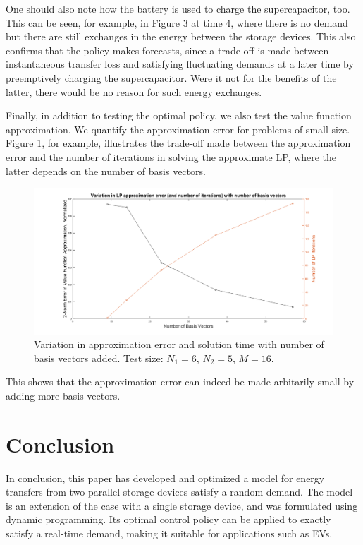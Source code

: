 \documentclass[conference]{IEEEtran}
\begin{document}
One should also note how the battery is used to charge the supercapacitor, too. This can be seen, for example, in Figure 3 at time 4, where there is no demand but there are still exchanges in the energy between the storage devices. This also confirms that the policy makes forecasts, since a trade-off is made between instantaneous transfer loss and satisfying fluctuating demands at a later time by preemptively charging the supercapacitor. Were it not for the benefits of the latter, there would be no reason for such energy exchanges.

Finally, in addition to testing the optimal policy, we also test the value function approximation. We quantify the approximation error for problems of small size. Figure \ref{fig:ApproxVsIter}, for example, illustrates the trade-off made between the approximation error and the number of iterations in solving the approximate LP, where the latter depends on the number of basis vectors. \begin{figure}[htbp]
\centerline{\includegraphics[scale=0.25]{ApproxErr_vs_NumIter.png}}
\caption{Variation in approximation error and solution time with number of basis vectors added. Test size: $N_{1}=6$, $N_{2}=5$, $M=16$.}
\label{fig:ApproxVsIter}
\end{figure} This shows that the approximation error can indeed be made arbitarily small by adding more basis vectors.



\section{Conclusion}
In conclusion, this paper has developed and optimized a model for energy transfers from two parallel storage devices satisfy a random demand. The model is an extension of the case with a single storage device, and was formulated using dynamic programming. Its optimal control policy can be applied to exactly satisfy a real-time demand, making it suitable for applications such as EVs.
\end{document}

